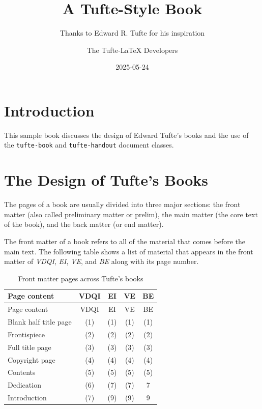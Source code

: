 \documentclass[
  twoside,
  symmetric]{tufte-book}
\title{A Tufte-Style Book}
\subtitle{Thanks to Edward R. Tufte for his inspiration}
\author{The Tufte-LaTeX Developers}
\date{2025-05-24}
\begin{document}
\frontmatter
\maketitle


\mainmatter
\chapter*{Introduction}\label{introduction}

This sample book discusses the design of Edward Tufte's
books\citep{Tufte2001, Tufte1990, Tufte1997, Tufte2006} and the use of
the \texttt{tufte-book} and \texttt{tufte-handout} document classes.

\chapter{The Design of Tufte's Books}\label{the-design-of-tuftes-books}

The pages of a book are usually divided into three major sections: the
front matter (also called preliminary matter or prelim), the main matter
(the core text of the book), and the back matter (or end matter).

The front matter of a book refers to all of the material that comes
before the main text. The following table shows a list of material that
appears in the front matter of \emph{VDQI}, \emph{EI}, \emph{VE}, and
\emph{BE} along with its page number.

\begin{longtable}[]{@{}lcccc@{}}
\caption{Front matter pages across Tufte's books}\tabularnewline
\toprule\noalign{}
Page content & VDQI & EI & VE & BE \\
\midrule\noalign{}
\endfirsthead
\toprule\noalign{}
Page content & VDQI & EI & VE & BE \\
\midrule\noalign{}
\endhead
\bottomrule\noalign{}
\endlastfoot
Blank half title page & (1) & (1) & (1) & (1) \\
Frontispiece & (2) & (2) & (2) & (2) \\
Full title page & (3) & (3) & (3) & (3) \\
Copyright page & (4) & (4) & (4) & (4) \\
Contents & (5) & (5) & (5) & (5) \\
Dedication & (6) & (7) & (7) & 7 \\
Introduction & (7) & (9) & (9) & 9 \\
\end{longtable}
\end{document}
